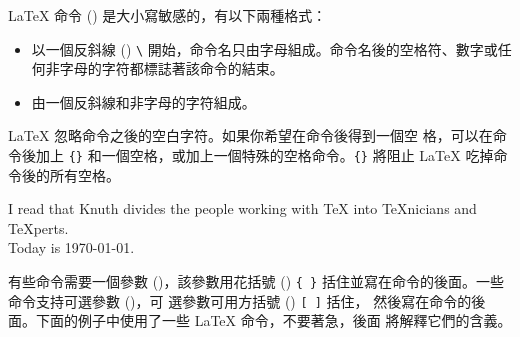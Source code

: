 
\LaTeX{} 命令 () 是大小寫敏感的，有以下兩種格式：
\begin{itemize}
\item 以一個反斜線 () \verb|\| 開始，命令名只由字母組成。命令名後的空格符、數字或任何非字母的字符都標誌著該命令的結束。
\item 由一個反斜線和非字母的字符組成。
\end{itemize}

%
%

%
%
\label{whitespace}


\LaTeX{} 忽略命令之後的空白字符。如果你希望在命令後得到一個空
格，可以在命令後加上 \verb|{}| 和一個空格，或加上一個特殊的空格命令。\verb|{}| 將阻止 \LaTeX{} 吃掉命令後的所有空格。

\begin{example}
I read that Knuth divides the
people working with \TeX{} into
\TeX{}nicians and \TeX perts.\\
Today is \today.
\end{example}


有些命令需要一個參數 ()，該參數用花括號 () \verb|{ }| 括住並寫在命令的後面。一些命令支持可選參數 ()，可 選參數可用方括號 () \verb|[ ]| 括住，
然後寫在命令的後面。下面的例子中使用了一些 \LaTeX{} 命令，不要著急，後面
將解釋它們的含義。

